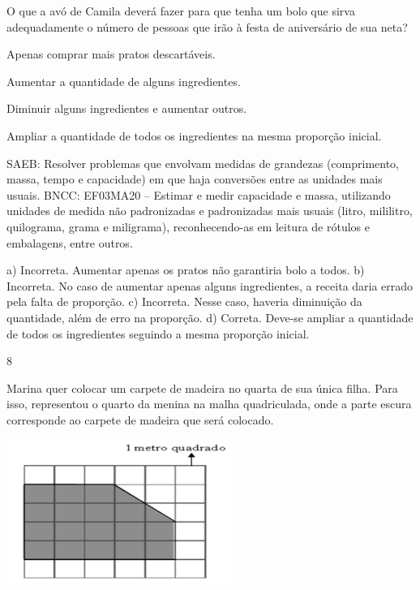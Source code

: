\begin{multicols}{2}
\begin{enumerate}
{O que a avó de Camila deverá fazer para que tenha um bolo que sirva adequadamente o número de pessoas que irão à festa de aniversário de sua neta?

\begin{escolha}
\item
  Apenas comprar mais pratos descartáveis.
\item
  Aumentar a quantidade de alguns ingredientes.
\item
  Diminuir alguns ingredientes e aumentar outros.
\item
  Ampliar a quantidade de todos os ingredientes na mesma proporção inicial.
\end{escolha}

SAEB: Resolver problemas que envolvam medidas de grandezas (comprimento, massa, tempo e capacidade) em que haja conversões entre as
unidades mais usuais.
BNCC: EF03MA20 -- Estimar e medir capacidade e massa, utilizando unidades de medida não
padronizadas e padronizadas mais usuais (litro, mililitro, quilograma, grama e miligrama),
reconhecendo-as em leitura de rótulos e embalagens, entre outros.

a) Incorreta. Aumentar apenas os pratos não garantiria bolo a todos.
b) Incorreta. No caso de aumentar apenas alguns ingredientes, a receita daria errado pela falta de proporção.
c) Incorreta. Nesse caso, haveria diminuição da quantidade, além de erro na proporção.
d) Correta. Deve-se ampliar a quantidade de todos os ingredientes seguindo a mesma proporção inicial.

\num{8}

Marina quer colocar um carpete de madeira no quarta de sua única filha.
Para isso, representou o quarto da menina na malha quadriculada, onde a parte escura corresponde ao carpete de madeira que será
colocado.


\includegraphics[width=2.90385in,height=1.84662in]{media/image123.png}

}
\end{enumerate}
\end{multicols}
